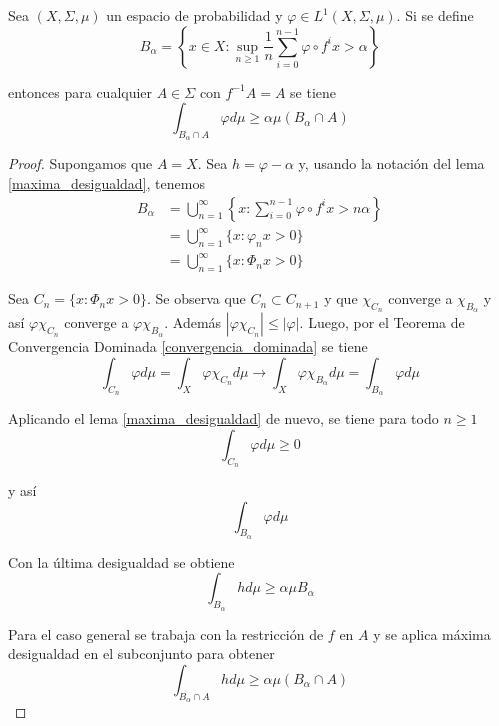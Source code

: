 \begin{lema}\label{maxima_desigualdad_cor}
	Sea $(X,\Sigma,\mu)$ un espacio de probabilidad y $\varphi \in L^1(X,\Sigma,\mu)$. Si se define	
	\begin{equation}
		B_{\alpha} = \left\{ x \in X: \sup_{n \geq 1} \frac{1}{n} \sum_{i=0}^{n-1} \varphi \circ f^i x > \alpha \right\}
	\end{equation}
	
	entonces para cualquier $A \in \Sigma$ con $f^{-1}A=A$ se tiene	
	\begin{equation}
		\int_{B_{\alpha} \cap A} \varphi d\mu \geq \alpha \mu(B_{\alpha} \cap A)
	\end{equation}
\end{lema}

\begin{proof}
	Supongamos que $A=X$. Sea $h = \varphi - \alpha$ y, usando la notación del lema \ref{maxima_desigualdad}, tenemos
	\begin{align}
		B_{\alpha} &= \bigcup_{n=1}^{\infty} \left\{ x: \sum_{i=0}^{n-1} \varphi \circ f^i x > n \alpha \right\}\\
		&= \bigcup_{n=1}^{\infty} \{ x: \varphi_n x > 0 \}\\
		&= \bigcup_{n=1}^{\infty} \{ x: \varPhi_n x > 0 \}
	\end{align}
	
	Sea $C_n = \{ x: \varPhi_n x > 0 \}$. Se observa que $C_n \subset C_{n+1}$ y que $\chi_{C_n}$ converge a $\chi_{B_{\alpha}}$ y así $\varphi \chi_{C_n}$ converge a $\varphi \chi_{B_{\alpha}}$. Además $|\varphi \chi_{C_n}| \leq |\varphi|$. Luego, por el Teorema de Convergencia Dominada \ref{convergencia_dominada} se tiene
	\begin{equation}
		\int_{C_n} \varphi d\mu = \int_X \varphi \chi_{C_n} d\mu \rightarrow \int_X \varphi \chi_{B_{\alpha}} d\mu = \int_{B_{\alpha}} \varphi d\mu 
	\end{equation}
	
	Aplicando el lema \ref{maxima_desigualdad} de nuevo, se tiene para todo $n \geq 1$
	\begin{equation}
		\int_{C_n} \varphi d\mu \geq 0
	\end{equation}
	
	y así
	\begin{equation}
		\int_{B_{\alpha}} \varphi d\mu
	\end{equation}
	
	Con la última desigualdad se obtiene
	\begin{equation}
		\int_{B_{\alpha}} h d\mu \geq \alpha \mu B_{\alpha}
	\end{equation}
	
	Para el caso general se trabaja con la restricción de $f$ en $A$ y se aplica máxima desigualdad en el subconjunto para obtener
	\begin{equation}
		\int_{B_{\alpha} \cap A} h d\mu \geq \alpha \mu(B_{\alpha} \cap A)
	\end{equation}
\end{proof}

